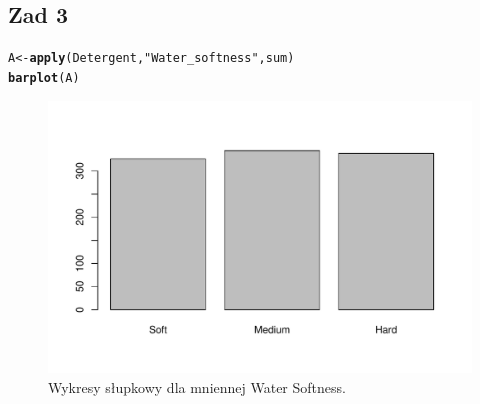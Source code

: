 \documentclass[12pt]{mwart}\usepackage[]{graphicx}\usepackage[]{color}
\makeatletter
\def\maxwidth{ %
  \ifdim\Gin@nat@width>\linewidth
    \linewidth
  \else
    \Gin@nat@width
  \fi
}
\newcommand{\hlstr}[1]{\textcolor[rgb]{0.192,0.494,0.8}{#1}}%
\newcommand{\hlstd}[1]{\textcolor[rgb]{0.345,0.345,0.345}{#1}}%
\newcommand{\hlkwb}[1]{\textcolor[rgb]{0.69,0.353,0.396}{#1}}%
\newcommand{\hlkwd}[1]{\textcolor[rgb]{0.737,0.353,0.396}{\textbf{#1}}}%
\newenvironment{kframe}{%
 \def\at@end@of@kframe{}%
 \ifinner\ifhmode%
  \def\at@end@of@kframe{\end{minipage}}%
  \begin{minipage}{\columnwidth}%
 \fi\fi%
 \def\FrameCommand##1{\hskip\@totalleftmargin \hskip-\fboxsep
 \colorbox{shadecolor}{##1}\hskip-\fboxsep
     \hskip-\linewidth \hskip-\@totalleftmargin \hskip\columnwidth}%
 \MakeFramed {\advance\hsize-\width
   \@totalleftmargin\z@ \linewidth\hsize
   \@setminipage}}%
 {\par\unskip\endMakeFramed%
 \at@end@of@kframe}
\newenvironment{knitrout}{}{} %
\makeatother
\begin{document}
  \subsection*{Zad 3}
\begin{knitrout}
\color{fgcolor}\begin{kframe}
\begin{alltt}
\hlstd{A} \hlkwb{<-} \hlkwd{apply}\hlstd{(Detergent,} \hlstr{"Water_softness"}\hlstd{, sum)}
\hlkwd{barplot}\hlstd{(A)}
\end{alltt}
\end{kframe}\begin{figure}[H]
\includegraphics[width=\maxwidth]{figure/r_fig_1-1} \caption{\label{fig:1}Wykresy słupkowy dla mniennej Water Softness.}\label{fig:r fig_1}
\end{figure}

\end{knitrout}
\end{document}
